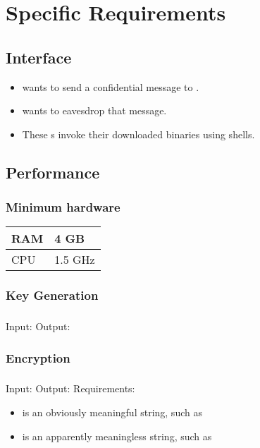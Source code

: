 \section{Specific Requirements}


\subsection{Interface}

\begin{frame}
\begin{itemize}
\item \alice{} wants to send a confidential message to \bob.
\item \eve{} wants to eavesdrop that message.
\item These \eu s invoke their downloaded \cry{} binaries
  using \cl{} shells.
\end{itemize}
\end{frame}


\subsection{Performance}

\begin{frame}
\frametitle{Minimum hardware}
\begin{tabular}{l|l}
RAM & 4 GB \\ \hline
CPU & 1.5 GHz
\end{tabular}
\end{frame}

\subsubsection{Key Generation}

\begin{frame}
\frametitle{\bob}
Input: \generatekeysin \medskip
Output: \generatekeysout
\end{frame}

\subsubsection{Encryption}

\begin{frame}
\frametitle{\alice}
Input: \encryptin \medskip
Output: \encryptout \medskip
Requirements:
\begin{itemize}
\item \plaintextarg{} is an obviously meaningful string,
  such as \plaintextex
\item \ciphertextarg{} is an apparently meaningless string,
  such as \ciphertextex
\end{itemize}
\end{frame}

